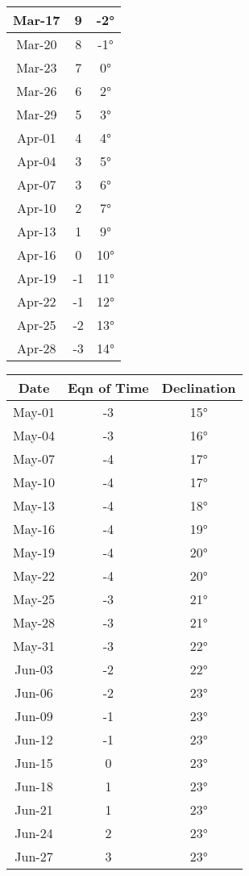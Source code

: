 \begin{footnotesize}
\begin{minipage}{0.33\textwidth}
\begin{tabular}[t]{c | c | c }
Mar-17 & 9 & -2°\\\hline
Mar-20 & 8 & -1°\\\hline
Mar-23 & 7 & 0°\\\hline
Mar-26 & 6 & 2°\\\hline
Mar-29 & 5 & 3°\\\hline
Apr-01 & 4 & 4°\\\hline
Apr-04 & 3 & 5°\\\hline
Apr-07 & 3 & 6°\\\hline
Apr-10 & 2 & 7°\\\hline
Apr-13 & 1 & 9°\\\hline
Apr-16 & 0 & 10°\\\hline
Apr-19 & -1 & 11°\\\hline
Apr-22 & -1 & 12°\\\hline
Apr-25 & -2 & 13°\\\hline
Apr-28 & -3 & 14°\\\hline
\end{tabular}\end{minipage}
\begin{minipage}{0.33\textwidth}
\begin{tabular}[t]{c | c | c}
Date&Eqn of Time&Declination\\\hline
May-01 & -3 & 15°\\\hline
May-04 & -3 & 16°\\\hline
May-07 & -4 & 17°\\\hline
May-10 & -4 & 17°\\\hline
May-13 & -4 & 18°\\\hline
May-16 & -4 & 19°\\\hline
May-19 & -4 & 20°\\\hline
May-22 & -4 & 20°\\\hline
May-25 & -3 & 21°\\\hline
May-28 & -3 & 21°\\\hline
May-31 & -3 & 22°\\\hline
Jun-03 & -2 & 22°\\\hline
Jun-06 & -2 & 23°\\\hline
Jun-09 & -1 & 23°\\\hline
Jun-12 & -1 & 23°\\\hline
Jun-15 & 0 & 23°\\\hline
Jun-18 & 1 & 23°\\\hline
Jun-21 & 1 & 23°\\\hline
Jun-24 & 2 & 23°\\\hline
Jun-27 & 3 & 23°\\\hline

\end{tabular}
\end{minipage}
\end{footnotesize}
